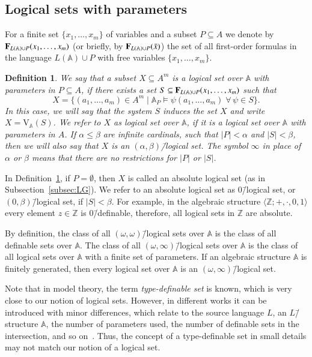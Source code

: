 \documentclass[12pt]{article}
\newtheorem{definition}{Definition}
\theoremstyle{definition}
\def\Z{{\mathbb{Z}}}
\def\MA{{\mathbb{A}}}
\def\V{{\mathrm{V}}}
\begin{document}
\subsection{Logical sets with parameters}\label{subsec:LS}

For a finite set $\{x_1,\ldots,x_m\}$ of variables and a subset $P\subseteq A$ we denote by ${\bf F}_{L(\MA)\cup P}(x_1,\ldots,x_m)$ (or briefly, by ${\bf F}_{L(\MA)\cup P}(\bar x)$) the set of all first-order formulas in the language $L(\MA)\cup P$ with free variables $\{x_1,\ldots,x_m\}$.

\begin{definition}\label{def1}
We say that a subset $X\subseteq A^m$ is {\em a logical set over $\MA$ with parameters in $P\subseteq A$}, if there exists a set $S\subseteq  {\bf F}_{L(\MA)\cup P}(x_1,\ldots,x_m)$ such that 
$$
X=\{(a_1,\ldots, a_m)\in A^m \mid \MA_P\models \psi (a_1,\ldots,a_m) \; \forall\, \psi \in S\}.
$$
In this case, we will say that the {\em system $S$  induces} the set $X$ and write $X=\V_\MA(S)$. We refer to $X$ as {\em logical set over $\MA$}, if it is a logical set over $\MA$ with parameters in $A$. If $\alpha\leqslant \beta$ are infinite cardinals, such that $|P|<\alpha$ and $|S|<\beta$, then we will also say that $X$ is an $(\alpha,\beta)$\=/logical set. The symbol $\infty$ in place of $\alpha$ or $\beta$ means that there are no restrictions for $|P|$ or $|S|$.
\end{definition}

In Definition~\ref{def1}, if $P=\emptyset$, then $X$ is called an absolute logical set (as in Subsection~\ref{subsec:LG}). We refer to an absolute logical set as $0$\=/logical set, or $(0,\beta)$\=/logical set, if $|S|<\beta$. For example, in the algebraic structure $\langle \Z; +, \cdot, 0, 1\rangle$ every element $z\in \Z$ is $0$\=/definable, therefore, all logical sets in $\Z$ are absolute.  

By definition, the class of all $(\omega,\omega)$\=/logical sets over $\MA$ is the class of all definable sets over $\MA$. The class of all $(\omega,\infty)$\=/logical sets over $\MA$ is the class of all logical sets over $\MA$ with a finite set of parameters. If an algebraic structure $\MA$ is finitely generated, then every logical set over $\MA$ is an $(\omega,\infty)$\=/logical set.

Note that in model theory, the term {\em type-definable set} is known, which is very close to our notion of logical sets. However, in different works it can be introduced with minor differences, which relate to the source language $L$, an $L$\=/structure $\MA$, the number of parameters used, the number of definable sets in the intersection, and so on~\cite{Dries, GarciaWagner, HartShami, HrushovskiPeterzilPillay, Johnson, Marikova, Milliet, Pillay1, Pillay2, Yaacov1, Yaacov2}. Thus, the concept of a type-definable set in small details may not match our notion of a logical set. 
\end{document}
